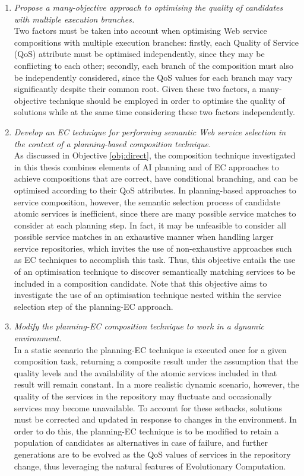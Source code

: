 \begin{enumerate}
 \item \label{obj:mo} \textit{Propose a many-objective approach to optimising the quality of candidates with multiple execution branches.}\\
 Two factors must be taken into account when optimising Web service compositions with multiple execution branches: firstly, each Quality of Service (QoS) attribute must be optimised independently, since they may be conflicting to each other; secondly, each branch of the composition must also be independently considered, since the QoS values for each branch may vary significantly despite their common root. Given these two factors, a many-objective technique should be employed in order to optimise the quality of solutions while at the same time considering these two factors independently.
 
 \item \label{obj:semantic} \textit{Develop an EC technique for performing semantic Web service selection in the context of a planning-based composition technique.}\\
 As discussed in Objective \ref{obj:direct}, the composition technique investigated in this thesis combines elements of AI planning and of EC approaches to achieve compositions that are correct, have conditional branching, and can be optimised according to their QoS attributes. In planning-based approaches to service composition, however, the semantic selection process of candidate atomic services is inefficient, since there are many possible service matches to consider at each planning step. In fact, it may be unfeasible to consider all possible service matches in an exhaustive manner when handling larger service repositories, which invites the use of non-exhaustive approaches such as EC techniques to accomplish this task. Thus, this objective entails the use of an optimisation technique to discover semantically matching services to be included in a composition candidate. Note that this objective aims to investigate the use of an optimisation technique nested within the service selection step of the planning-EC approach.
 
 \item \label{obj:dynamic} \textit{Modify the planning-EC composition technique to work in a dynamic environment.}\\
 In a static scenario the planning-EC technique is executed once for a given composition task, returning a composite result under the assumption that the quality levels and the availability of the atomic services included in that result will remain constant. In a more realistic dynamic scenario, however, the quality of the services in the repository may fluctuate and occasionally services may become unavailable. To account for these setbacks, solutions must be corrected and updated in response to changes in the environment. In order to do this, the planning-EC technique is to be modified to retain a population of candidates as alternatives in case of failure, and further generations are to be evolved as the QoS values of services in the repository change, thus leveraging the natural features of Evolutionary Computation.
 
\end{enumerate}

